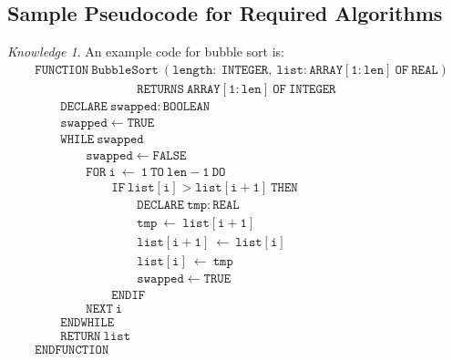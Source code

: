 \documentclass[8pt]{article}
\theoremstyle{remark}
\newtheorem{knowledge}{Knowledge}[subsection]
\begin{document}
        \subsection{Sample Pseudocode for Required Algorithms}
            \begin{knowledge}
                An example code for bubble sort is:
                \begin{align*}
                    &\mathtt{FUNCTION\ BubbleSort\ (length:\ INTEGER,\ list:ARRAY [1:len]\ OF\ REAL)}\\
                    &\qquad \qquad \qquad \qquad \mathtt{RETURNS\ ARRAY [1:len]\ OF\ INTEGER}\\
                    &\qquad \mathtt{DECLARE\ swapped:BOOLEAN}\\
                    &\qquad \mathtt{swapped \leftarrow TRUE}\\
                    &\qquad \mathtt{WHILE\ swapped}\\
                    &\qquad \qquad \mathtt{swapped \leftarrow FALSE}\\
                    &\qquad \qquad \mathtt{FOR\ i\ \leftarrow\ 1\ TO\ len - 1\ DO}\\
                    &\qquad \qquad \qquad \mathtt{IF\ list[i] > list[i + 1]\ THEN}\\
                    &\qquad \qquad \qquad \qquad \mathtt{DECLARE\ tmp:REAL}\\
                    &\qquad \qquad \qquad \qquad \mathtt{tmp\ \leftarrow\ list[i + 1]}\\
                    &\qquad \qquad \qquad \qquad \mathtt{list[i + 1]\ \leftarrow\ list[i]}\\
                    &\qquad \qquad \qquad \qquad \mathtt{list[i]\ \leftarrow\ tmp}\\
                    &\qquad \qquad \qquad \qquad \mathtt{swapped \leftarrow TRUE}\\
                    &\qquad \qquad \qquad \mathtt{ENDIF}\\
                    &\qquad \qquad \mathtt{NEXT\ i}\\
                    &\qquad \mathtt{ENDWHILE}\\
                    &\qquad \mathtt{RETURN\ list}\\
                    &\mathtt{ENDFUNCTION}
                \end{align*}
            \end{knowledge}
\end{document}
